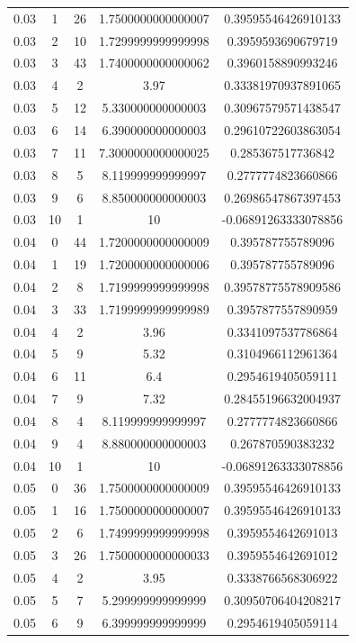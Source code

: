 \documentclass[paper=a4, fontsize=11pt]{scrartcl} %
\numberwithin{equation}{section} %
\numberwithin{figure}{section} %
\numberwithin{table}{section} %
\begin{document}
\begin{center}
\begin{tabular}{ |c|c|c|c|c| }
    0.03 & 1 & 26 & 1.7500000000000007 & 0.39595546426910133 \\
    0.03 & 2 & 10 & 1.7299999999999998 & 0.3959593690679719 \\
    0.03 & 3 & 43 & 1.7400000000000062 & 0.3960158890993246 \\
    0.03 & 4 & 2 & 3.97 & 0.33381970937891065 \\
    0.03 & 5 & 12 & 5.330000000000003 & 0.30967579571438547 \\
    0.03 & 6 & 14 & 6.390000000000003 & 0.29610722603863054 \\
    0.03 & 7 & 11 & 7.3000000000000025 & 0.285367517736842 \\
    0.03 & 8 & 5 & 8.119999999999997 & 0.2777774823660866 \\
    0.03 & 9 & 6 & 8.850000000000003 & 0.26986547867397453 \\
    0.03 & 10 & 1 & 10 & -0.06891263333078856 \\
    0.04 & 0 & 44 & 1.7200000000000009 & 0.395787755789096 \\
    0.04 & 1 & 19 & 1.7200000000000006 & 0.395787755789096 \\
    0.04 & 2 & 8 & 1.7199999999999998 & 0.39578775578909586 \\
    0.04 & 3 & 33 & 1.7199999999999989 & 0.3957877557890959 \\
    0.04 & 4 & 2 & 3.96 & 0.3341097537786864 \\
    0.04 & 5 & 9 & 5.32 & 0.3104966112961364 \\
    0.04 & 6 & 11 & 6.4 & 0.2954619405059111 \\
    0.04 & 7 & 9 & 7.32 & 0.28455196632004937 \\
    0.04 & 8 & 4 & 8.119999999999997 & 0.2777774823660866 \\
    0.04 & 9 & 4 & 8.880000000000003 & 0.267870590383232 \\
    0.04 & 10 & 1 & 10 & -0.06891263333078856 \\
    0.05 & 0 & 36 & 1.7500000000000009 & 0.39595546426910133 \\
    0.05 & 1 & 16 & 1.7500000000000007 & 0.39595546426910133 \\
    0.05 & 2 & 6 & 1.7499999999999998 & 0.3959554642691013 \\
    0.05 & 3 & 26 & 1.7500000000000033 & 0.3959554642691012 \\
    0.05 & 4 & 2 & 3.95 & 0.3338766568306922 \\
    0.05 & 5 & 7 & 5.299999999999999 & 0.30950706404208217 \\
    0.05 & 6 & 9 & 6.399999999999999 & 0.2954619405059114 \\
	\hline
\end{tabular}
\end{center}
\end{document}
